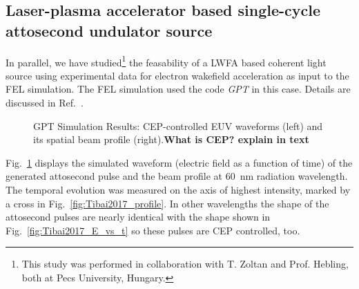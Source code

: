 \subsection{Laser-plasma accelerator based single-cycle attosecond undulator source}
In parallel, we have studied\footnote{This study was performed in collaboration
with T. Zoltan and Prof. Hebling, both at Pecs University, Hungary.} the feasability of a LWFA based coherent light
source using experimental data for electron wakefield acceleration as input to
the FEL simulation. The FEL simulation used the code \textit{GPT} in this case.
Details are discussed in Ref.~\cite{Tibai2017}.
%
\begin{figure}[ht]
  \caption{GPT Simulation Results: CEP-controlled EUV waveforms (left) and its spatial beam
    profile (right).\textbf{What is CEP? explain in text}}
    \label{fig:Tibai2017}
\end{figure}
%
Fig.~\ref{fig:Tibai2017} displays the simulated waveform (electric field as
a function of time)  of the generated attosecond
pulse and the beam profile at \SI{60}{\nano\metre} radiation wavelength. The
temporal evolution was measured on the axis of highest intensity, marked by  a
cross in Fig.~\ref{fig:Tibai2017_profile}. In other
wavelengths the shape of the attosecond pulses are nearly identical with the
shape shown in Fig.~\ref{fig:Tibai2017_E_vs_t} so these pulses are CEP controlled, too.

